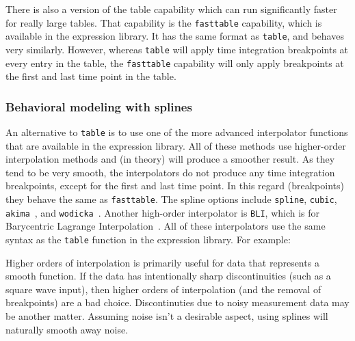 
There is also a version of the table capability which can run significantly faster 
for really large tables.  That capability is the \texttt{fasttable} capability, 
which is available in the \Xyce{} expression library.
It has the same format as \texttt{table}, and behaves very similarly.  However, 
whereas \texttt{table} will apply time integration breakpoints at every entry in 
the table, the \texttt{fasttable} capability will only apply breakpoints at 
the first and last time point in the table.

\subsubsection{Behavioral modeling with splines}

An alternative to \texttt{table} is to use one of the more advanced
interpolator functions that are available in the \Xyce{} expression library.   
All of these methods use higher-order 
interpolation methods and (in theory) will produce a smoother result.  As they 
tend to be very smooth, the interpolators do not produce any time integration 
breakpoints, except for the first and last time point.  In this regard 
(breakpoints) they behave the same as \texttt{fasttable}.
The spline options include \texttt{spline}, \texttt{cubic}, 
\texttt{akima}~\cite{10.1145/321607.321609}, and \texttt{wodicka}~\cite{Engeln1996}. 
Another high-order interpolator is \texttt{BLI}, which is for Barycentric Lagrange 
Interpolation~\cite{Berrut_barycentriclagrange}.  All of these interpolators use the same 
syntax as the \texttt{table} function in the expression library.  For example:


Higher orders of interpolation is primarily useful for data that represents a smooth function.   
If the data has intentionally sharp discontinuities (such as a square wave input), then 
higher orders of interpolation (and the removal of breakpoints) are a bad choice.
Discontinuties due to noisy measurement data may be another matter.  Assuming noise isn't a 
desirable aspect, using splines will naturally smooth away noise.

